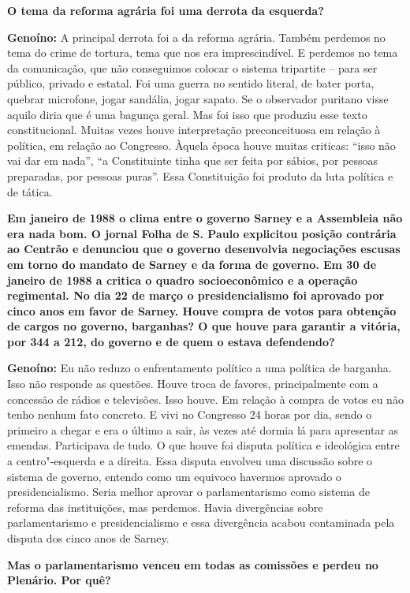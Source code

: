 \textbf{O tema da reforma agrária foi uma derrota da esquerda?}

\textbf{Genoíno:} A principal derrota foi a da reforma agrária. Também
perdemos no tema do crime de tortura, tema que nos era imprescindível. E
perdemos no tema da comunicação, que não conseguimos colocar o sistema
tripartite -- para ser público, privado e estatal. Foi uma guerra no
sentido literal, de bater porta, quebrar microfone, jogar sandália,
jogar sapato. Se o observador puritano visse aquilo diria que é uma
bagunça geral. Mas foi isso que produziu esse texto constitucional.
Muitas vezes houve interpretação preconceituosa em relação à política,
em relação ao Congresso. Àquela época houve muitas criticas: ``isso não
vai dar em nada'', ``a Constituinte tinha que ser feita por sábios, por
pessoas preparadas, por pessoas puras''. Essa Constituição foi produto
da luta política e de tática.

\textbf{Em janeiro de 1988 o clima entre o governo Sarney e a Assembleia
não era nada bom. O jornal Folha de S. Paulo explicitou posição
contrária ao Centrão e denunciou que o governo desenvolvia negociações
escusas em torno do mandato de Sarney e da forma de governo. Em 30 de
janeiro de 1988 a  critica o quadro socioeconômico e a operação
regimental. No dia 22 de março o presidencialismo foi aprovado por cinco
anos em favor de Sarney. Houve compra de votos para obtenção de cargos
no governo, barganhas? O que houve para garantir a vitória, por 344 a
212, do governo e de quem o estava defendendo?}

\textbf{Genoíno:} Eu não reduzo o enfrentamento político a uma política
de barganha. Isso não responde as questões. Houve troca de favores,
principalmente com a concessão de rádios e televisões. Isso houve. Em
relação à compra de votos eu não tenho nenhum fato concreto. E vivi no
Congresso 24 horas por dia, sendo o primeiro a chegar e era o último a
sair, às vezes até dormia lá para apresentar as emendas. Participava de
tudo. O que houve foi disputa política e ideológica entre a
centro"-esquerda e a direita. Essa disputa envolveu uma discussão sobre o
sistema de governo, entendo como um equivoco havermos aprovado o
presidencialismo. Seria melhor aprovar o parlamentarismo como sistema de
reforma das instituições, mas perdemos. Havia divergências sobre
parlamentarismo e presidencialismo e essa divergência acabou contaminada
pela disputa dos cinco anos de Sarney.

\textbf{Mas o parlamentarismo venceu em todas as comissões e perdeu no
Plenário. Por quê?}

